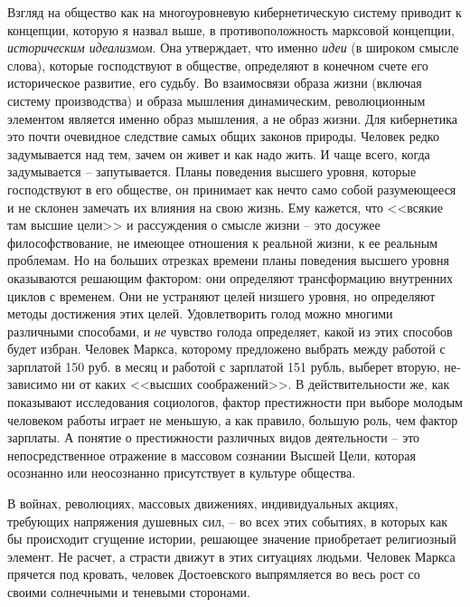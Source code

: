 \documentclass{book}
\begin{document}
Взгляд на общество как на многоуровневую кибернетиче­скую систему приводит к концепции, которую я назвал выше, в противоположность марксовой концепции, \textit{историческим идеализмом}.  Она утверждает, что именно \textit{идеи}  (в широком смысле слова), которые господствуют в обществе, определяют в конечном счете его историческое развитие, его судьбу. Во взаимосвязи образа жизни (включая систему производства) и образа мышления динамическим, революционным элемен­том является именно образ мышления, а не образ жизни. Для кибернетика это почти очевидное следствие самых общих зако­нов природы. Человек редко задумывается над тем, зачем он живет и как надо жить. И чаще всего, когда задумывается -- запутывается. Планы поведения высшего уровня, которые господствуют в его обществе, он принимает как нечто само собой разумеющееся и не склонен замечать их влияния на свою жизнь. Ему кажется, что <<всякие там высшие цели>> и рассуж­дения о смысле жизни -- это досужее философствование, не имеющее отношения к реальной жизни,
 к ее реальным 
пробле­мам. Но на больших отрезках времени планы поведения выс­шего уровня оказываются решающим фактором: они опреде­ляют трансформацию внутренних циклов с временем. Они не устраняют целей низшего уровня, но определяют методы до­стижения этих целей. Удовлетворить голод можно многими различными способами, и \textit{не}  чувство голода определяет, ка­кой из этих способов будет избран. Человек Маркса, которо­му предложено выбрать между работой с зарплатой 150 руб. в месяц и работой с зарплатой 151 рубль, выберет вторую, не­зависимо ни от каких <<высших соображений>>. В действительности же, как показывают исследования социологов, фактор престижности при выборе молодым человеком работы играет не меньшую, а как правило, большую роль, чем фактор зарплаты. А понятие о престижности различных видов деятель­ности -- это непосредственное отражение в массовом сознании Высшей Цели, которая осознанно или неосознанно присутствует в культуре общества.

В войнах, революциях, массовых движениях, индивидуаль­ных акциях, требующих напряжения душевных сил, -- во всех этих событиях, в которых как бы происходит сгущение истории, решающее значение приобретает религиозный элемент. Не расчет, а страсти движут в этих ситуациях людьми. Человек Маркса прячется под кровать, человек Достоевского выпрямляется во весь рост со своими солнечными и теневыми сторонами.
\end{document}
